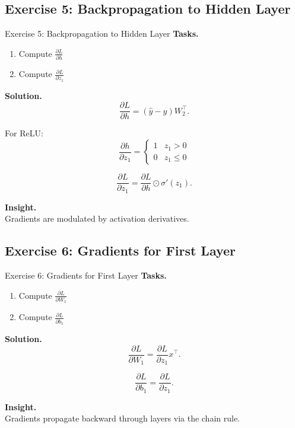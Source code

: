 \documentclass[aspectratio=169,11pt]{beamer}
\begin{document}
\subsection{Exercise 5: Backpropagation to Hidden Layer}
\begin{frame}[t,allowframebreaks]{Exercise 5: Backpropagation to Hidden Layer}
\small
\textbf{Tasks.}\\ \begin{enumerate}
    \item Compute $\frac{\partial L}{\partial h}$
    \item Compute $\frac{\partial L}{\partial z_1}$
\end{enumerate}

\textbf{Solution.}\\ \[
\frac{\partial L}{\partial h} = (\hat{y} - y) W_2^\top.
\]

For ReLU:
\[
\frac{\partial h}{\partial z_1} =
\begin{cases}
1 & z_1 > 0 \\
0 & z_1 \leq 0
\end{cases}
\]

\[
\frac{\partial L}{\partial z_1} =
\frac{\partial L}{\partial h} \odot \sigma'(z_1).
\]

\textbf{Insight.}\\ Gradients are modulated by activation derivatives.
\end{frame}

\subsection{Exercise 6: Gradients for First Layer}
\begin{frame}[t,allowframebreaks]{Exercise 6: Gradients for First Layer}
\small
\textbf{Tasks.}\\ \begin{enumerate}
    \item Compute $\frac{\partial L}{\partial W_1}$
    \item Compute $\frac{\partial L}{\partial b_1}$
\end{enumerate}

\textbf{Solution.}\\ \[
\frac{\partial L}{\partial W_1} =
\frac{\partial L}{\partial z_1} x^\top.
\]

\[
\frac{\partial L}{\partial b_1} =
\frac{\partial L}{\partial z_1}.
\]

\textbf{Insight.}\\ Gradients propagate backward through layers via the chain rule.
\end{frame}
\end{document}
